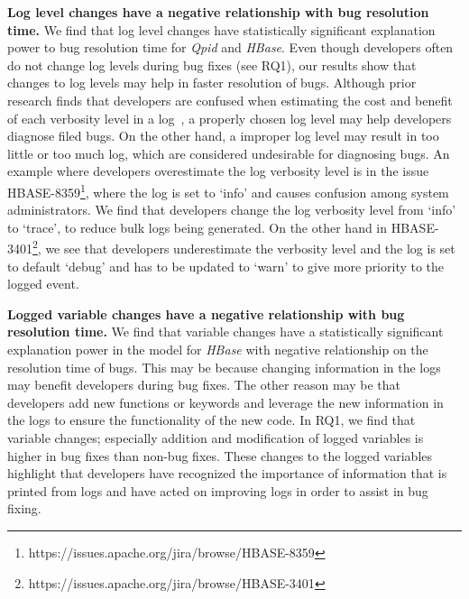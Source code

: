 \textbf{Log level changes have a negative relationship with bug resolution time.} 
We find that log level changes have statistically significant explanation power to bug resolution time for \emph{Qpid} and \emph{HBase}. Even though developers often do not change log levels during bug fixes (see RQ1), our results show that changes to log levels may help in faster resolution of bugs. Although prior research finds that developers are confused when estimating the cost and benefit of each verbosity level in a log~\cite{Characterizinglogs}, a properly chosen log level may help developers diagnose filed bugs. On the other hand, a improper log level may result in too little or too much log, which are considered undesirable for diagnosing bugs. An example where developers overestimate the log verbosity level is in the issue HBASE-8359\footnote{https://issues.apache.org/jira/browse/HBASE-8359}, where the log is set to `info' and causes confusion among system administrators. We find that developers change the log verbosity level from `info' to `trace', to reduce bulk logs being generated. On the other hand in HBASE-3401\footnote{https://issues.apache.org/jira/browse/HBASE-3401}, we see that developers underestimate the verbosity level and the log is set to default `debug' and has to be updated to `warn' to give more priority to the logged event.  

\textbf{Logged variable changes have a negative relationship with bug resolution time.} 
We find that variable changes have a statistically significant explanation power in the model for \emph{HBase} with negative relationship on the resolution time of bugs. This may be because changing information in the logs may benefit developers during bug fixes. The other reason may be that developers add new functions or keywords and leverage the new information in the logs to ensure the functionality of the new code. In RQ1, we find that variable changes; especially addition and modification of logged variables is higher in bug fixes than non-bug fixes. These changes to the logged variables highlight that developers have recognized the importance of information that is printed from logs and have acted on improving logs in order to assist in bug fixing.


